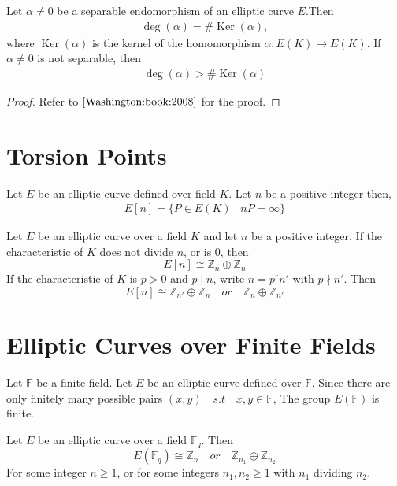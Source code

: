 
\begin{proposition}
    Let $\alpha \neq 0$ be a separable endomorphism of an elliptic curve $E$.Then 
    \begin{align*}
      \operatorname{deg}(\alpha) = \# \operatorname{Ker}(\alpha), 
    \end{align*}
    where $\operatorname{Ker}(\alpha)$ is the kernel of the homomorphism $\alpha: E(K) \rightarrow E(K)$.
    If $\alpha \neq 0$ is not separable, then 
    \begin{align*}
        \operatorname{deg}(\alpha) > \# \operatorname{Ker}(\alpha)
    \end{align*}
\end{proposition}

\begin{proof}
    Refer to $\cite{Washington:book:2008}$ for the proof. 
\end{proof}

\section{Torsion Points}
Let $E$ be an elliptic curve defined over field $K$. Let $n$ be a positive integer then, 
\begin{align*}
   E[n] = \{P \in E(K) \mid nP = \infty\}
\end{align*}

\begin{theorem}
    Let $E$ be an elliptic curve over a field $K$ and let $n$ be a positive integer. If the characteristic of $K$ does not divide $n$, or is 0, then
\[ E[n] \cong \mathbb{Z}_n \oplus \mathbb{Z}_n \]
If the characteristic of $K$ is $p > 0$ and $p \mid n$, write $n = p^r n'$ with $p \nmid n'$. Then
\[ E[n] \cong \mathbb{Z}_{n'} \oplus \mathbb{Z}_n \quad or \quad \mathbb{Z}_n \oplus \mathbb{Z}_{n'} \]
\end{theorem}
 
\section{Elliptic Curves over Finite Fields}
Let $\mathbb{F}$ be a finite field. Let $E$ be an elliptic curve defined over $\mathbb{F}$. Since there are only finitely many possible pairs $(x,y) \quad s.t \quad x,y \in \mathbb{F}$, The group $E(\mathbb{F})$ is finite.
\begin{theorem}
    Let $E$ be an elliptic curve over a field $\mathbb{F}_q$. Then
\[ E(\mathbb{F}_q) \cong \mathbb{Z}_n \quad or \quad \mathbb{Z}_{n_1} \oplus \mathbb{Z}_{n_2} \]
For some integer $n \geq 1$, or for some integers $n_1,n_2 \geq 1$ with $n_1$ dividing $n_2$.
\end{theorem}

